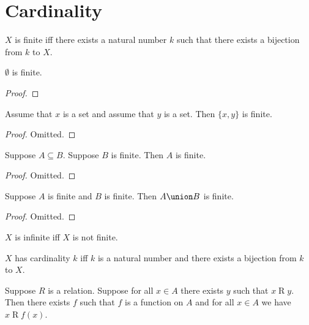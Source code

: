 \section{Cardinality}\label{form_sec_cardinality}

\begin{definition}\label{finite}
    $X$ is finite iff there exists a natural number $k$ such that
        there exists a bijection from $k$ to $X$.
\end{definition}


\begin{lemma} \label{emptyset_is_finite}
    $\emptyset$ is finite.
\end{lemma}
\begin{proof}
\end{proof}

\begin{lemma} \label{pair_is_finite}
    Assume that $x$ is a set and assume that $y$ is a set.
    Then $\{x,y\}$ is finite.
\end{lemma}
\begin{proof}
 Omitted.
\end{proof}

\begin{lemma} \label{subseteq_finite_is_finite}
    Suppose $A\subseteq B$.
    Suppose $B$ is finite.
    Then $A$ is finite.
\end{lemma}
\begin{proof}
    Omitted.
\end{proof}

\begin{lemma} \label{union_of_finite_is_finite}
    Suppose $A$ is finite and $B$ is finite.
    Then $A\union B$ is finite.
\end{lemma}
\begin{proof}
    Omitted.
\end{proof}

\begin{abbreviation}\label{infinite}
    $X$ is infinite iff $X$ is not finite.
\end{abbreviation}

\begin{definition}\label{cardinality}
    $X$ has cardinality $k$ iff $k$ is a natural number and
    there exists a bijection from $k$ to $X$.
\end{definition}

\begin{axiom}\label{axiom_of_choice}
    Suppose $R$ is a relation.
    Suppose for all $x\in A$ there exists $y$ such that $x\mathrel{R} y$.
    Then there exists $f$ such that $f$ is a function on $A$ and for all $x\in A$ we have $x\mathrel{R} f(x)$.
\end{axiom}

